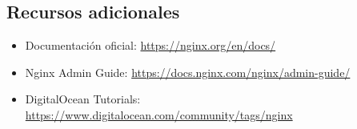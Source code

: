 \documentclass[11pt,a4paper]{article}
\begin{document}
\subsection{Recursos adicionales}

\begin{itemize}
    \item Documentación oficial: \url{https://nginx.org/en/docs/}
    \item Nginx Admin Guide: \url{https://docs.nginx.com/nginx/admin-guide/}
    \item DigitalOcean Tutorials: \url{https://www.digitalocean.com/community/tags/nginx}
\end{itemize}
\end{document}
